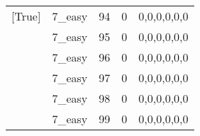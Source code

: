 \begin{tabular}{llrrl}
 [True]          & 7\_easy              &            94 &                     0 & 0,0,0,0,0,0   \\
 [True]          & 7\_easy              &            95 &                     0 & 0,0,0,0,0,0   \\
 [True]          & 7\_easy              &            96 &                     0 & 0,0,0,0,0,0   \\
 [True]          & 7\_easy              &            97 &                     0 & 0,0,0,0,0,0   \\
 [True]          & 7\_easy              &            98 &                     0 & 0,0,0,0,0,0   \\
 [True]          & 7\_easy              &            99 &                     0 & 0,0,0,0,0,0   \\
\hline
\end{tabular}